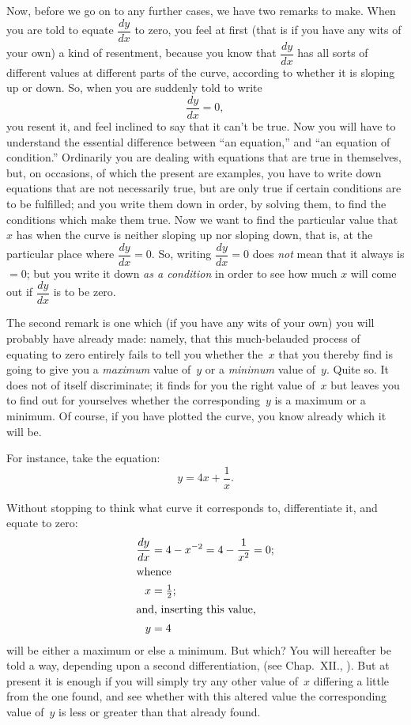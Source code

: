 \documentclass[12pt]{book}[2005/09/16]
\newcommand{\DPPageSep}[2]{\Pagelabel{#2}}
\newcommand{\Pagelabel}[1]
  {\phantomsection\label{#1}}
\newcommand{\Pageref}[2][p.]{%
  \ifthenelse{\not\equal{#1}{}}{%
    \hyperref[#2]{#1~\pageref{#2}}%
  }{%
    \hyperref[#2]{\pageref{#2}}%
  }%
}
\begin{document}
Now, before we go on to any further cases, we have
two remarks to make. When you are told to equate
$\dfrac{dy}{dx}$ to zero, you feel at first (that is if you have any
wits of your own) a kind of resentment, because you
know that $\dfrac{dy}{dx}$ has all sorts of different values at
different parts of the curve, according to whether it
is sloping up or down. So, when you are suddenly
told to write
\[
\frac{dy}{dx} = 0,
\]
you resent it, and feel inclined to say that it can't be
true. Now you will have to understand the essential
difference between ``an equation,'' and ``an equation
of condition.'' Ordinarily you are dealing with equations
that are true in themselves, but, on occasions,
of which the present are examples, you have to write
down equations that are not necessarily true, but are
only true if certain conditions are to be fulfilled; and
you write them down in order, by solving them, to
find the conditions which make them true. Now we
want to find the particular value that $x$ has when
the curve is neither sloping up nor sloping down, that
is, at the particular place where $\dfrac{dy}{dx} = 0$. So, writing
$\dfrac{dy}{dx} = 0$ does \emph{not} mean that it always is $=0$; but you
write it down \emph{as a condition} in order to see how
much $x$ will come out if $\dfrac{dy}{dx}$ is to be zero.
\DPPageSep{110.png}{98}%

The second remark is one which (if you have any
wits of your own) you will probably have already
made: namely, that this much-belauded process of
equating to zero entirely fails to tell you whether
the~$x$ that you thereby find is going to give you
a \emph{maximum} value of~$y$ or a \emph{minimum} value of~$y$.
Quite so. It does not of itself discriminate; it finds
for you the right value of~$x$ but leaves you to find
out for yourselves whether the corresponding~$y$ is a
maximum or a minimum. Of course, if you have
plotted the curve, you know already which it will be.

For instance, take the equation:
\[
y = 4x + \frac{1}{x}.
\]

Without stopping to think what curve it corresponds
to, differentiate it, and equate to zero:
\begin{align*}
\frac{dy}{dx}  &= 4 - x^{-2} = 4 - \frac{1}{x^2} = 0; \\
\intertext{whence}
x &= \tfrac{1}{2}; \\
\intertext{and, inserting this value,}
y &= 4
\end{align*}
will be either a maximum or else a minimum. But
which? You will hereafter be told a way, depending
upon a second differentiation, (see Chap.~XII., \Pageref{chap:XII}).
But at present it is enough if you will simply try
any other value of~$x$ differing a little from the one
found, and see whether with this altered value the
corresponding value of~$y$ is less or greater than that
already found.
\DPPageSep{111.png}{99}%
\end{document}
